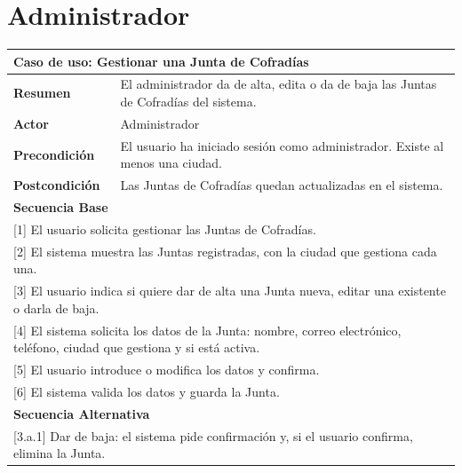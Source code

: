 \section{Administrador}

\begin{table}[h!]
    \centering
    \renewcommand{\arraystretch}{1.5}

    \begin{tabular}{|p{4cm}|p{11cm}|}
        \hline
        \multicolumn{2}{|l|}{\textbf{Caso de uso: Gestionar una Junta de Cofradías}} \\
        \hline
        \textbf{Resumen} & El administrador da de alta, edita o da de baja las Juntas de Cofradías del sistema. \\
        \hline
        \textbf{Actor} & Administrador \\
        \hline
        \textbf{Precondición} & El usuario ha iniciado sesión como administrador. Existe al menos una ciudad. \\
        \hline
        \textbf{Postcondición} & Las Juntas de Cofradías quedan actualizadas en el sistema. \\
        \hline
        \multicolumn{2}{|l|}{\textbf{Secuencia Base}} \\
        \hline
        \multicolumn{2}{|p{15cm}|}{ [1] El usuario solicita gestionar las Juntas de Cofradías. } \\
        \hline
        \multicolumn{2}{|p{15cm}|}{ [2] El sistema muestra las Juntas registradas, con la ciudad que gestiona cada una. } \\
        \hline
        \multicolumn{2}{|p{15cm}|}{ [3] El usuario indica si quiere dar de alta una Junta nueva, editar una existente o darla de baja. } \\
        \hline
        \multicolumn{2}{|p{15cm}|}{ [4] El sistema solicita los datos de la Junta: nombre, correo electrónico, teléfono, ciudad que gestiona y si está activa. } \\
        \hline
        \multicolumn{2}{|p{15cm}|}{ [5] El usuario introduce o modifica los datos y confirma. } \\
        \hline
        \multicolumn{2}{|p{15cm}|}{ [6] El sistema valida los datos y guarda la Junta. } \\
        \hline
        \multicolumn{2}{|l|}{\textbf{Secuencia Alternativa}} \\
        \hline
        \multicolumn{2}{|p{15cm}|}{ [3.a.1] Dar de baja: el sistema pide confirmación y, si el usuario confirma, elimina la Junta. } \\

\end{tabular}
\end{table}
